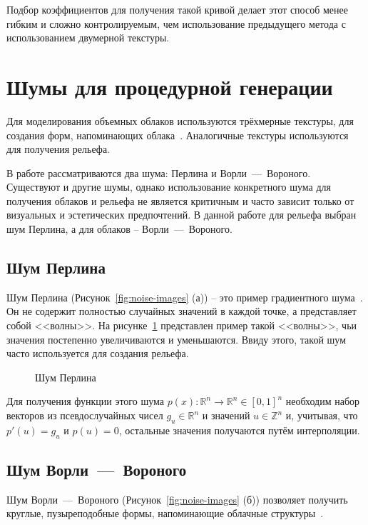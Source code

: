 Подбор коэффициентов для получения такой кривой делает этот способ менее гибким и сложно контролируемым, чем использование предыдущего метода с использованием двумерной текстуры. 

\section{Шумы для процедурной генерации}
Для моделирования объемных облаков используются трёхмерные текстуры, для создания форм, напоминающих облака~\cite{windahl_real_time_2018}. Аналогичные текстуры используются для получения рельефа.

В работе рассматриваются два шума: Перлина и Ворли~---~Вороного. Существуют и другие шумы, однако использование конкретного шума для получения облаков и рельефа не является критичным и часто зависит только от визуальных и эстетических предпочтений. В данной работе для рельефа выбран шум Перлина, а для облаков -- Ворли~---~Вороного. 
\subsection{Шум Перлина}
Шум Перлина (Рисунок~\ref{fig:noise-images} (а)) -- это пример градиентного шума~\cite{hirnschall_perlin_2024}. Он не содержит полностью случайных значений в каждой точке, а представляет собой <<волны>>. На рисунке~\ref{fig:perlin-xy-image} представлен пример такой <<волны>>, чьи значения постепенно увеличиваются и уменьшаются. Ввиду этого, такой шум часто  используется для создания рельефа.
\begin{figure}[htb!]
	\centering
		
		\caption{Шум Перлина}
		\label{fig:perlin-xy-image}
\end{figure}


Для получения функции этого шума $p(x): \mathbb{R}^n \rightarrow \mathbb{R}^n \in [0, 1]^n$ необходим набор векторов из псевдослучайных чисел $g_u \in \mathbb{R}^n$ и значений $u \in \mathbb{Z}^n$ и, учитывая, что $p'(u) = g_u$ и $p(u) = 0$, остальные значения получаются путём интерполяции.
\subsection{Шум Ворли~---~Вороного}
Шум Ворли~---~Вороного (Рисунок~\ref{fig:noise-images} (б)) позволяет получить круглые, пузыреподобные формы, напоминающие облачные структуры~\cite{guerrilla_volumetric_cloudscapes_2023, thebookofshaders_cellular_noise_2024}.

